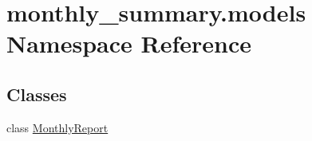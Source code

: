 \hypertarget{namespacemonthly__summary_1_1models}{\section{monthly\-\_\-summary.\-models Namespace Reference}
\label{namespacemonthly__summary_1_1models}
}
\subsection*{Classes}
\begin{DoxyCompactItemize}
\item 
class \hyperlink{classmonthly__summary_1_1models_1_1MonthlyReport}{Monthly\-Report}
\end{DoxyCompactItemize}
